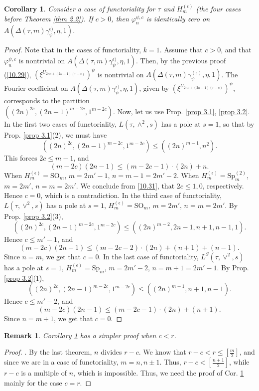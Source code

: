\documentclass[12pts]{amsart}
\newcommand{\SO}{{\mathrm{SO}}}
\newcommand{\Sp}{{\mathrm{Sp}}}
\newtheorem{cor}[thm]{Corollary}
\newtheorem{rmk}[thm]{Remark}
\begin{document}
\begin{cor}\label{cor 10.2}
Consider a case of functoriality for $\tau$ and $H_m^{(\epsilon)}$ (the four cases before Theorem \ref{thm 2.2}). If $c>0$, then $\varphi_n^{\psi,c}$ is identically zero on $A(\Delta(\tau,m)\gamma_\psi^{\epsilon)},\eta,1)$.
\end{cor}
\begin{proof}
Note that in the cases of functoriality, $k=1$. Assume that $c>0$, and that $\varphi_n^{\psi,c}$ is nontrivial on $A(\Delta(\tau,m)\gamma_\psi^{\epsilon)},\eta,1)$. Then, by the previous proof (\eqref{10.29}), $(\xi^{U_{2nc+(2n-1)(r-c)}})^\psi $ is nontrivial on $A(\Delta(\tau,m)\gamma_\psi^{(\epsilon)},\eta,1)$. The Fourier coefficient on $A(\Delta(\tau,m)\gamma_\psi^{\epsilon)},\eta,1)$, given by $(\xi^{U_{2nc+(2n-1)(r-c)}})^\psi $, corresponds to the partition\\
 $((2n)^{2c},(2n-1)^{m-2c},1^{m-2c})$. Now, let us use Prop. \ref{prop 3.1}, \ref{prop 3.2}. In the first two cases of functoriality, $L(\tau,\wedge^2,s)$ has a pole at $s=1$, so that by  Prop. \ref{prop 3.1}(2), we must have
\begin{equation}\label{10.30}
((2n)^{2c},(2n-1)^{m-2c},1^{m-2c})\leq ((2n)^{m-1},n^2).
\end{equation}
This forces $2c\leq m-1$, and 
\begin{equation}\label{10.31}
(m-2c)(2n-1)\leq (m-2c-1)\cdot (2n)+n.
\end{equation}
When $H^{(\epsilon)}_m=\SO_m$, $m=2m'-1$, $n=m-1=2m'-2$. When $H_m^{(\epsilon)}=\Sp_m^{(2)} $, $m=2m'$, $n=m=2m'$. We conclude from \eqref{10.31}, that $2c\leq 1, 0$, respectively. Hence $c=0$, which is a contradiction. 
In the third case of functoriality, $L(\tau,\vee^2,s)$ has a pole at $s=1$, $H_m^{(\epsilon)}=\SO_m$, $m=2m'$, $n=m=2m'$. By Prop. \ref{prop 3.2}(3),
$$
((2n)^{2c},(2n-1)^{m-2c},1^{m-2c})\leq ((2n)^{m-2},2n-1,n+1,n-1,1).
$$
Hence $c\leq m'-1$, and 
$$
(m-2c)(2n-1)\leq (m-2c-2)\cdot(2n)+(n+1)+(n-1).
$$
Since $n=m$, we get that $c=0$.
In the last case of functoriality, $L^S(\tau,\vee^2,s)$ has a pole at $s=1$, $H_m^{(\epsilon)}=\Sp_m$, $m=2m'-2$, $n=m+1=2m'-1$. By Prop. \ref{prop 3.2}(1),
$$
((2n)^{2c},(2n-1)^{m-2c},1^{m-2c})\leq ((2n)^{m-1},n+1,n-1).
$$ 
Hence $c\leq m'-2$, and 
$$
(m-2c)(2n-1)\leq (m-2c-1)\cdot(2n)+(n+1).
$$
Since $n=m+1$, we get that $c=0$.
 
\end{proof}

\begin{rmk}\label{rmk 10.2.1}
Corollary \ref{cor 10.2} has a simpler proof when $c<r$.
\end{rmk}
\begin{proof}.
By the last theorem, $n$ divides $r-c$. We know that $r-c<r\leq [\frac{m}{2}]$, and since we are in a case of functoriality, $m=n, n\pm 1$.
Thus, $r-c<[\frac{n+1}{2}]$, while $r-c$ is a multiple of $n$, which is impossible. Thus, we need the proof of Cor. \ref{cor 10.2} mainly for the case $c=r$.
\end{proof}
\end{document}
